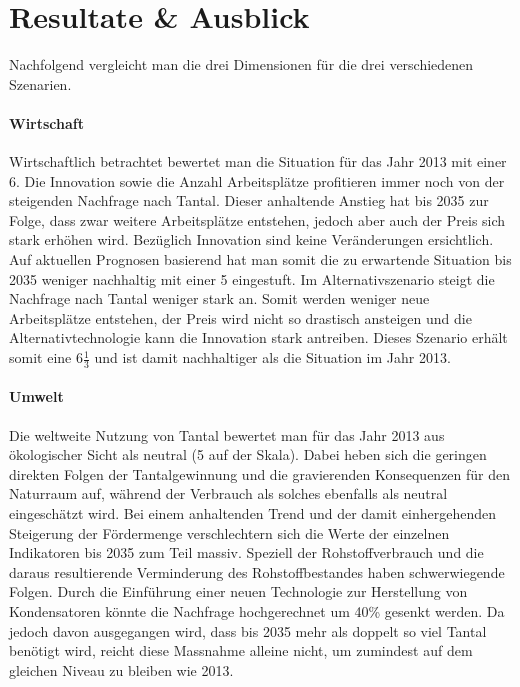 \section{Resultate \& Ausblick}\label{sec:conflict}

Nachfolgend vergleicht man die drei Dimensionen für die drei verschiedenen Szenarien.

\paragraph{Wirtschaft}
Wirtschaftlich betrachtet bewertet man die Situation für das Jahr 2013 mit einer 6.
Die Innovation sowie die Anzahl Arbeitsplätze profitieren immer noch von
der steigenden Nachfrage nach Tantal. Dieser anhaltende Anstieg hat bis 2035 zur Folge,
dass zwar weitere Arbeitsplätze entstehen, jedoch aber auch der Preis sich stark erhöhen
wird. Bezüglich Innovation sind keine Veränderungen ersichtlich. Auf aktuellen Prognosen
basierend hat man somit die zu erwartende Situation bis 2035 weniger nachhaltig mit einer 5 eingestuft.
Im Alternativszenario steigt die Nachfrage nach Tantal weniger stark an. Somit werden
weniger neue Arbeitsplätze entstehen, der Preis wird nicht so drastisch ansteigen
und die Alternativtechnologie kann die Innovation stark antreiben. Dieses Szenario
erhält somit eine 6\(\frac{1}{3}\) und ist damit nachhaltiger als die Situation
im Jahr 2013.

\paragraph{Umwelt}
Die weltweite Nutzung von Tantal bewertet man für das Jahr 2013 aus ökologischer
Sicht als neutral (5 auf der Skala). Dabei heben sich die geringen direkten
Folgen der Tantalgewinnung und die gravierenden Konsequenzen für den Naturraum
auf, während der Verbrauch als solches ebenfalls als neutral eingeschätzt wird.
Bei einem anhaltenden Trend und der damit einhergehenden Steigerung der
Fördermenge verschlechtern sich die Werte der einzelnen Indikatoren bis 2035 zum
Teil massiv. Speziell der Rohstoffverbrauch und die daraus resultierende
Verminderung des Rohstoffbestandes haben schwerwiegende Folgen. Durch die
Einführung einer neuen Technologie zur Herstellung von Kondensatoren könnte die
Nachfrage hochgerechnet um 40\% gesenkt werden. Da jedoch davon ausgegangen
wird, dass bis 2035 mehr als doppelt so viel Tantal benötigt wird, reicht
diese Massnahme alleine nicht, um zumindest auf dem gleichen Niveau zu bleiben
wie 2013. 

